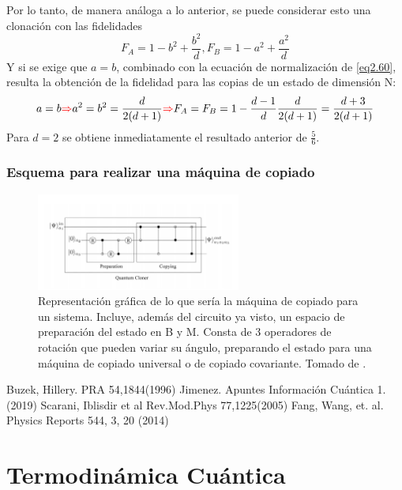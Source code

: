 \documentclass{book}
\begin{document}
Por lo tanto, de manera análoga a lo anterior, se puede considerar esto una clonación con las fidelidades
\begin{equation} \label{eq2.65}{ 
F_A=1-b^2+\frac{b^2}{d}, F_B=1-a^2+\frac{a^2}{d}
}\end{equation}
Y si se exige que $a=b$, combinado con la ecuación de normalización de \ref{eq2.60}, resulta la obtención de la fidelidad para las copias de un estado de dimensión N:
\begin{equation}\label{eq2.66}{ a=b \textcolor{red}{\Rightarrow} a^2=b^2=\frac{d}{2(d+1)}\textcolor{red}{\Rightarrow} F_A=F_B=1-\frac{d-1}{d}\frac{d}{2(d+1)} =\frac{d+3}{2(d+1)}}\end{equation}
Para $d=2$ se obtiene inmediatamente el resultado anterior de $\frac{5}{6}$.
\subsection{Esquema para realizar una máquina de copiado}
\begin{figure}[ht][ht]
\centering
\label{cir2}
\includegraphics[width=0.6\textwidth]{circuito2.png}
\caption{Representación gráfica de lo que sería la máquina de copiado para un sistema. Incluye, además del circuito ya visto, un espacio de preparación del estado en B y M. Consta de 3 operadores de rotación que pueden variar su ángulo, preparando el estado para una máquina de copiado universal o de copiado covariante. Tomado de \cite{bib4}.}
\end{figure}
\begin{thebibliography}{9}
 Buzek, Hillery. PRA 54,1844(1996)
 Jimenez. Apuntes Información Cuántica 1. (2019)
 Scarani, Iblisdir et al Rev.Mod.Phys 77,1225(2005)
  Fang, Wang, et. al. Physics Reports 544, 3, 20 (2014) 
\end{thebibliography}

\chapter{Termodinámica Cuántica}
\end{document}
